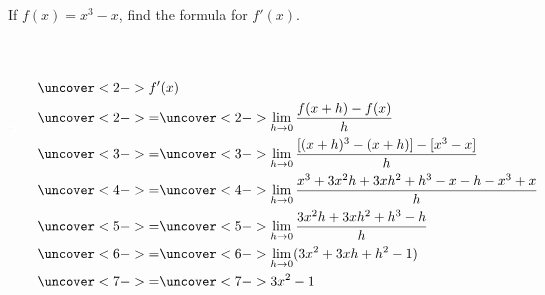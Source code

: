 \begin{frame}
\begin{example}[Example 3, p. 148]
If $f(x) = x^3-x$, find the formula for $f'(x)$.
\begin{columns}[c]
\ \includegraphics[height=3cm]{derivatives/pictures/03-02-ex2a.pdf}%

\ %
%
\begin{align*}
&\uncover<2->{f'(x)}\\%
 & \uncover<2->{ = } %
\uncover<2->{\lim_{h\rightarrow 0} \frac{f(x+h)-f(x)}{h}}\\%
 & \uncover<3->{ = } %
\uncover<3->{\lim_{h\rightarrow 0} \frac{[(x+h)^3 - (x+h)]-[x^3-x]}{h}}\\%
 & \uncover<4->{ = } %
\uncover<4->{\lim_{h\rightarrow 0} \frac{x^3 + 3x^2h+3xh^2+h^3-x-h-x^3+x}{h}}\\%
 & \uncover<5->{ = } %
\uncover<5->{\lim_{h\rightarrow 0} \frac{3x^2h+3xh^2+h^3-h}{h}}\\%
 & \uncover<6->{ = } %
\uncover<6->{\lim_{h\rightarrow 0} (3x^2+3xh+h^2-1)}\\%
 & \uncover<7->{ = } %
\uncover<7->{3x^2-1}%
\end{align*}
\end{columns}
\end{example}
\end{frame}
